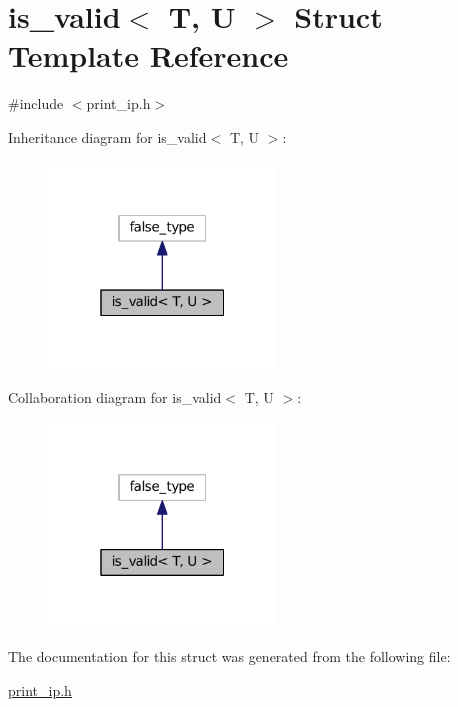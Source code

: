 \hypertarget{structis__valid_3_01T_00_01U_01_4}{}\section{is\+\_\+valid$<$ T, U $>$ Struct Template Reference}
\label{structis__valid_3_01T_00_01U_01_4}


{\ttfamily \#include $<$print\+\_\+ip.\+h$>$}



Inheritance diagram for is\+\_\+valid$<$ T, U $>$\+:
\nopagebreak
\begin{figure}[H]
\begin{center}
\leavevmode
\includegraphics[width=172pt]{structis__valid_3_01T_00_01U_01_4__inherit__graph}
\end{center}
\end{figure}


Collaboration diagram for is\+\_\+valid$<$ T, U $>$\+:
\nopagebreak
\begin{figure}[H]
\begin{center}
\leavevmode
\includegraphics[width=172pt]{structis__valid_3_01T_00_01U_01_4__coll__graph}
\end{center}
\end{figure}


The documentation for this struct was generated from the following file\+:\begin{DoxyCompactItemize}
\item 
\hyperlink{print__ip_8h}{print\+\_\+ip.\+h}\end{DoxyCompactItemize}
